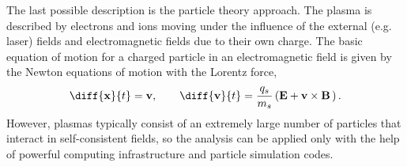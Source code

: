The last possible description is the particle theory approach. The plasma is described by electrons and ions moving under the influence of the external (e.g. laser) fields and electromagnetic fields due to their own charge. The basic equation of motion for a charged particle in an electromagnetic field is given by the Newton equations of motion with the Lorentz force,
\begin{equation}
\label{2.2.5}
\diff{\vec{x}}{t} = \vec{v}, \qquad \diff{\vec{v}}{t} = \frac{q_s}{m_s} \left(\vec{E} + \vec{v} \times \vec{B} \, \right).
\end{equation}
However, plasmas typically consist of an extremely large number of particles that interact in self-consistent fields, so the analysis can be applied only with the help of powerful computing infrastructure and particle simulation codes.